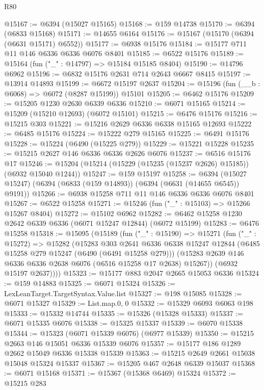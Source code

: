\begin{lexlean}{R80}
\begin{coremodule}
@15167 := @6394 (@15027 @15165)
@15168 := @159 @14738
@15170 := @6394 (@6833 @15168)
@15171 := @14655 @6164
@15176 := @15167 (@15170 (@6394 (@6631 @15171) @6552))
@15177 := @6938 @15176
@15184 := @15177 @711 @11 @146 @6336 @6336 @6076 @8401
@15185 := @6522 @15176
@15189 := @15164 (fun ("_" : @14797) => @15184 @15185 @8404)
@15190 := @14796 @6962
@15196 := @6832 @15176 @2631 @714 @2643 @6667 @8415
@15197 := @13914 @14893
@15199 := @6672 @15197 @2637
@15204 := @15196 (fun (__b : @6068) => @6072 (@8287 @15199)) @15101
@15205 := @6462 @15176
@15209 := @15205 @1230 @2630 @6339 @6336
@15210 := @6071 @15165
@15214 := @15209 (@15210 @12693) (@6072 @15101)
@15215 := @6476 @15176
@15216 := @15215 @303
@15221 := @15216 @2629 @6336 @6338 @15165 @12693
@15222 := @6485 @15176
@15224 := @15222 @279 @15165
@15225 := @6491 @15176
@15228 := @15224 (@6490 (@15225 @279))
@15229 := @15221 @15228
@15235 := @15215 @2627 @146 @6336 @6336 @2626 @6076
@15237 := @6516 @15176 @17
@15246 := @15204 (@15214 (@15229 (@15235 (@15237 @2626) @15185)) (@6932 @15040 @1244))
@15247 := @159 @15197
@15258 := @6394 (@15027 @15247) (@6394 (@6833 (@159 @14893)) (@6394 (@6631 (@14655 @6545)) @9191))
@15266 := @6938 @15258 @711 @11 @146 @6336 @6336 @6076 @8401
@15267 := @6522 @15258
@15271 := @15246 (fun ("_" : @15103) => @15266 @15267 @8404)
@15272 := @15102 @6962
@15282 := @6462 @15258 @1230 @2642 @6339 @6336 (@6071 @15247 @12844) (@6072 @15199)
@15283 := @6476 @15258
@15318 := @15095
    (@15189
      (fun ("_" : @15190) =>
      @15271
        (fun ("_" : @15272) =>
        @15282
          (@15283
            @303
            @2641
            @6336
            @6338
            @15247
            @12844
            (@6485 @15258 @279 @15247 (@6490 (@6491 @15258 @279)))
            (@15283 @2639 @146 @6336 @6336 @2638 @6076 (@6516 @15258 @17 @2638) @15267))
          (@6932 @15197 @2637))))
@15323 := @15177 @883 @2047 @2665 @15053 @6336
@15324 := @159 @14883
@15325 := @6071 @15324
@15326 := LexLeanTarget.TargetSyntax.Value.list
@15327 := @198 @15085
@15328 := @6071 @15327
@15329 := List.map.{0, 0}
@15332 := @15329 @6093 @6063 @198
@15333 := @15332 @14744
@15335 := @15326 (@15328 @15333)
@15337 := @6071 @15335 @6076
@15338 := @15325 @15337
@15339 := @6070 @15338
@15344 := @15323 (@6071 @15339 @6076) (@6977 @15339)
@15350 := @15215 @2663 @146 @15051 @6336 @15339 @6076
@15357 := @15177 @186 @1289 @2662 @15049 @6336 @15338 @15339
@15363 := @15215 @2649 @2661 @15038 @15048 @15324 @15337
@15367 := @15205 @467 @2648 @6339 @15037
@15368 := @6071 @15168
@15371 := @15367 (@15368 @6469) @15324
@15372 := @15215 @283

\end{coremodule}
\end{lexlean}
